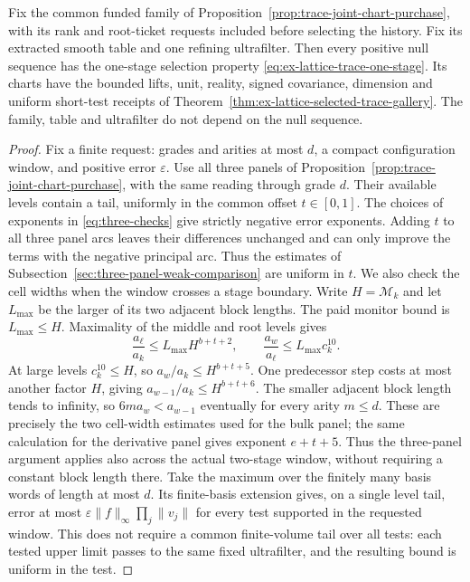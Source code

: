 \begin{proposition}
\label{prop:c14-prescribed-chart-supply}
Fix the common funded family of
Proposition~\ref{prop:trace-joint-chart-purchase}, with its rank and
root-ticket requests included before selecting the history. Fix its
extracted smooth table and one refining ultrafilter. Then every positive
null sequence has the one-stage selection property
\eqref{eq:ex-lattice-trace-one-stage}. Its charts have the bounded lifts,
unit, reality, signed covariance, dimension and uniform short-test
receipts of Theorem~\ref{thm:ex-lattice-selected-trace-gallery}.
The family, table and ultrafilter do not depend on the null sequence.
\end{proposition}
\begin{proof}
Fix a finite request: grades and arities at most $d$, a compact
configuration window, and positive error $\varepsilon$. Use all three
panels of Proposition~\ref{prop:trace-joint-chart-purchase}, with the
same reading through grade $d$. Their available levels contain a tail,
uniformly in the common offset $t\in[0,1]$. The choices of exponents
in \eqref{eq:three-checks} give strictly negative error exponents.
Adding $t$ to all three panel arcs leaves their differences unchanged
and can only improve the terms with the negative principal arc.
Thus the estimates of Subsection~\ref{sec:three-panel-weak-comparison}
are uniform in $t$. We also check the cell widths when the window
crosses a stage boundary. Write $H=\mathcal M_k$ and let $L_{\max}$
be the larger of its two adjacent block lengths. The paid monitor bound
is $L_{\max}\le H$. Maximality of the middle and root levels gives
\[
 \frac{a_\ell}{a_k}\le L_{\max}H^{b+t+2},\qquad
 \frac{a_w}{a_\ell}\le L_{\max}c_k^{10}.
\]
At large levels $c_k^{10}\le H$, so $a_w/a_k\le H^{b+t+5}$.
One predecessor step costs at most another factor $H$, giving
$a_{w-1}/a_k\le H^{b+t+6}$. The smaller adjacent block length tends
to infinity, so $6m a_w<a_{w-1}$ eventually for every arity $m\le d$.
These are precisely the two cell-width estimates used for the bulk
panel; the same calculation for the derivative panel gives exponent
$e+t+5$. Thus the three-panel argument applies also across the actual
two-stage window, without requiring a constant block length there.
Take the maximum over the finitely many basis
words of length at most $d$. Its finite-basis extension gives, on a
single level tail, error at most
$\varepsilon\|f\|_\infty\prod_j\|v_j\|$ for every test supported in
the requested window. This does not require a common finite-volume
tail over all tests: each tested upper limit passes to the same fixed
ultrafilter, and the resulting bound is uniform in the test.


\end{proof}
